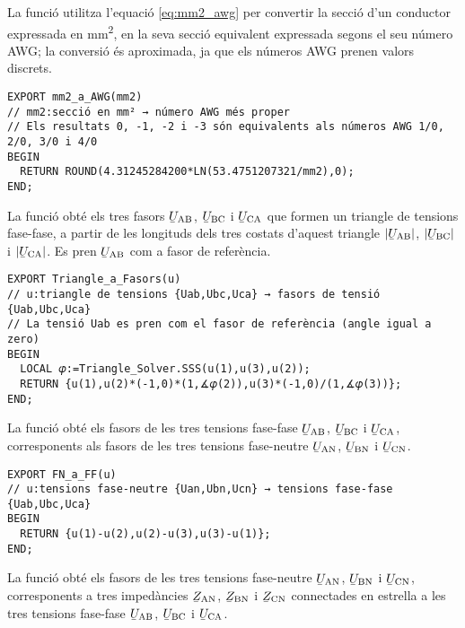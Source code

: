 La funció  utilitza l'equació \eqref{eq:mm2_awg} per convertir la secció d'un conductor expressada en \unit{mm^2}, en la seva secció equivalent expressada segons el seu número AWG; la conversió és aproximada, ja que els números AWG prenen valors discrets.

\begin{lstlisting}[caption={HP Prime --- Funció mm2\_a\_AWG}]
EXPORT mm2_a_AWG(mm2)
// mm2:secció en mm² → número AWG més proper
// Els resultats 0, -1, -2 i -3 són equivalents als números AWG 1/0, 2/0, 3/0 i 4/0
BEGIN
  RETURN ROUND(4.31245284200*LN(53.4751207321/mm2),0);
END;
\end{lstlisting}


La funció  obté els tres fasors $\cmplx{U}\ped{AB}$, $\cmplx{U}\ped{BC}$ i $\cmplx{U}\ped{CA}$ que formen un triangle de tensions fase-fase, a partir de les longituds dels tres costats d'aquest triangle $|\cmplx{U}\ped{AB}|$, $|\cmplx{U}\ped{BC}|$ i $|\cmplx{U}\ped{CA}|$. Es pren $\cmplx{U}\ped{AB}$ com a fasor de referència.

\begin{lstlisting}[caption={HP Prime --- Funció Triangle\_a\_Fasors},label=lst:TriFas]
EXPORT Triangle_a_Fasors(u)
// u:triangle de tensions {Uab,Ubc,Uca} → fasors de tensió {Uab,Ubc,Uca}
// La tensió Uab es pren com el fasor de referència (angle igual a zero)
BEGIN
  LOCAL 𝜑:=Triangle_Solver.SSS(u(1),u(3),u(2));
  RETURN {u(1),u(2)*(-1,0)*(1,∡𝜑(2)),u(3)*(-1,0)/(1,∡𝜑(3))};
END;
\end{lstlisting}

La funció  obté els fasors de les tres tensions fase-fase $\cmplx{U}\ped{AB}$, $\cmplx{U}\ped{BC}$ i $\cmplx{U}\ped{CA}$, corresponents als fasors de les tres tensions fase-neutre
$\cmplx{U}\ped{AN}$, $\cmplx{U}\ped{BN}$ i $\cmplx{U}\ped{CN}$.

\begin{lstlisting}[caption={HP Prime --- Funció FN\_a\_FF}, label=lst:FNaFF]
EXPORT FN_a_FF(u)
// u:tensions fase-neutre {Uan,Ubn,Ucn} → tensions fase-fase {Uab,Ubc,Uca}
BEGIN
  RETURN {u(1)-u(2),u(2)-u(3),u(3)-u(1)};
END;
\end{lstlisting}

La funció  obté els fasors de les tres tensions fase-neutre $\cmplx{U}\ped{AN}$, $\cmplx{U}\ped{BN}$ i $\cmplx{U}\ped{CN}$, corresponents a tres impedàncies $\cmplx{Z}\ped{AN}$, $\cmplx{Z}\ped{BN}$ i $\cmplx{Z}\ped{CN}$ connectades en estrella a  les tres tensions fase-fase
$\cmplx{U}\ped{AB}$, $\cmplx{U}\ped{BC}$ i $\cmplx{U}\ped{CA}$.

